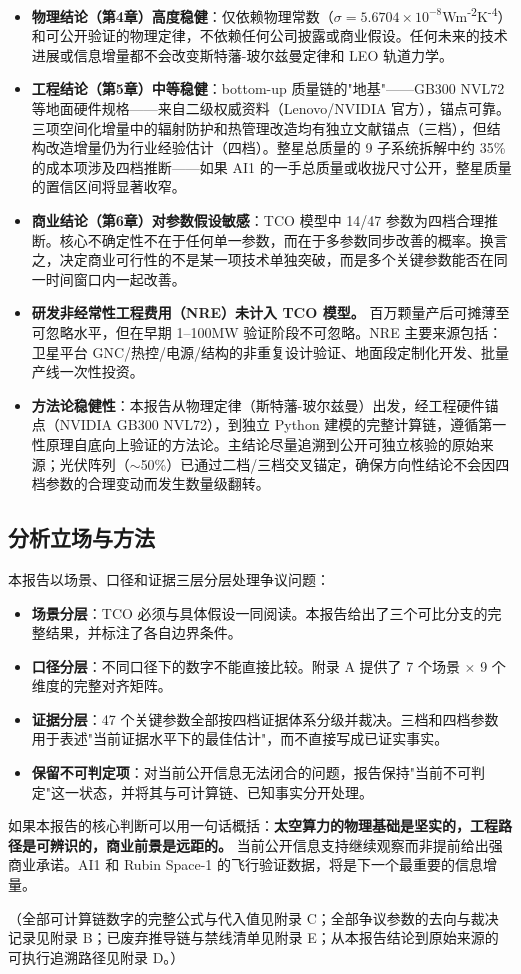 \begin{itemize}[leftmargin=*]
    \item \textbf{物理结论（第4章）高度稳健}：仅依赖物理常数（$\sigma = 5.6704\times10^{-8}$\;W\;m\textsuperscript{-2}\;K\textsuperscript{-4}）和可公开验证的物理定律，不依赖任何公司披露或商业假设。任何未来的技术进展或信息增量都不会改变斯特藩-玻尔兹曼定律和 LEO 轨道力学。
    
    \item \textbf{工程结论（第5章）中等稳健}：bottom-up 质量链的"地基"——GB300 NVL72 等地面硬件规格——来自二级权威资料（Lenovo/NVIDIA 官方），锚点可靠。三项空间化增量中的辐射防护和热管理改造均有独立文献锚点（三档），但结构改造增量仍为行业经验估计（四档）。整星总质量的 9 子系统拆解中约 35\% 的成本项涉及四档推断——如果 AI1 的一手总质量或收拢尺寸公开，整星质量的置信区间将显著收窄。
    
    \item \textbf{商业结论（第6章）对参数假设敏感}：TCO 模型中 14/47 参数为四档合理推断。核心不确定性不在于任何单一参数，而在于多参数同步改善的概率。换言之，决定商业可行性的不是某一项技术单独突破，而是多个关键参数能否在同一时间窗口内一起改善。

    \item \textbf{研发非经常性工程费用（NRE）未计入 TCO 模型。} 百万颗量产后可摊薄至可忽略水平，但在早期 1--100\;MW 验证阶段不可忽略。NRE 主要来源包括：卫星平台 GNC/热控/电源/结构的非重复设计验证、地面段定制化开发、批量产线一次性投资。

    \item \textbf{方法论稳健性}：本报告从物理定律（斯特藩-玻尔兹曼）出发，经工程硬件锚点（NVIDIA GB300 NVL72），到独立 Python 建模的完整计算链，遵循第一性原理自底向上验证的方法论。主结论尽量追溯到公开可独立核验的原始来源；光伏阵列（$\sim$50\%）已通过二档/三档交叉锚定，确保方向性结论不会因四档参数的合理变动而发生数量级翻转。
\end{itemize}

\subsection{分析立场与方法}

本报告以场景、口径和证据三层分层处理争议问题：

\begin{itemize}[leftmargin=*]
    \item \textbf{场景分层}：TCO 必须与具体假设一同阅读。本报告给出了三个可比分支的完整结果，并标注了各自边界条件。
    \item \textbf{口径分层}：不同口径下的数字不能直接比较。附录 A 提供了 7 个场景 $\times$ 9 个维度的完整对齐矩阵。
    \item \textbf{证据分层}：47 个关键参数全部按四档证据体系分级并裁决。三档和四档参数用于表述"当前证据水平下的最佳估计"，而不直接写成已证实事实。
    \item \textbf{保留不可判定项}：对当前公开信息无法闭合的问题，报告保持"当前不可判定"这一状态，并将其与可计算链、已知事实分开处理。
\end{itemize}

如果本报告的核心判断可以用一句话概括：\textbf{太空算力的物理基础是坚实的，工程路径是可辨识的，商业前景是远距的。} 当前公开信息支持继续观察而非提前给出强商业承诺。AI1 和 Rubin Space-1 的飞行验证数据，将是下一个最重要的信息增量。

（全部可计算链数字的完整公式与代入值见附录 C；全部争议参数的去向与裁决记录见附录 B；已废弃推导链与禁线清单见附录 E；从本报告结论到原始来源的可执行追溯路径见附录 D。）

\endinput
